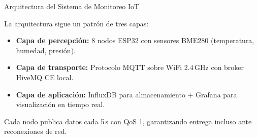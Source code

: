 \documentclass[aspectratio=169, 12pt]{beamer}
\begin{document}
\begin{frame}{Arquitectura del Sistema de Monitoreo IoT}

  \hspace{0.55cm}
  \begin{minipage}{0.88\textwidth}
    La arquitectura sigue un patrón de tres capas:
    \vspace{0.4em}
    \begin{itemize}
      \item \textbf{Capa de percepción:} 8 nodos ESP32 con sensores BME280
        (temperatura, humedad, presión).
      \item \textbf{Capa de transporte:} Protocolo MQTT sobre WiFi 2.4\,GHz
        con broker HiveMQ CE local.
      \item \textbf{Capa de aplicación:} InfluxDB para almacenamiento
        + Grafana para visualización en tiempo real.
    \end{itemize}

    \vspace{0.5em}
    \begin{tcolorbox}[cajaNota, top=3pt, bottom=3pt]
      Cada nodo publica datos cada 5\,s con QoS 1, garantizando entrega
      incluso ante reconexiones de red.
    \end{tcolorbox}
  \end{minipage}
\end{frame}
\end{document}

